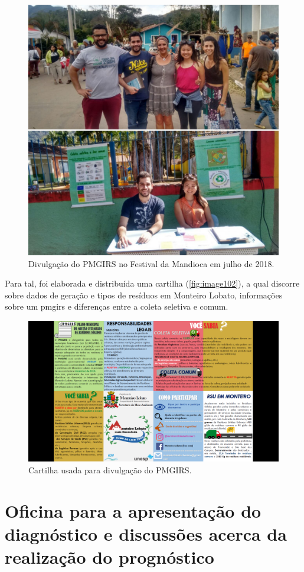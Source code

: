 \begin{figure}
	\centering
	\includegraphics[width=0.75\linewidth]{produtos/prodtres/image101}
	\caption{Divulgação do PMGIRS no Festival da Mandioca em julho de 2018.}
	\label{fig:image101}
\end{figure}

Para tal, foi elaborada e distribuída uma cartilha (\autoref{fig:image102}), a qual discorre sobre dados de geração e tipos de resíduos em Monteiro Lobato, informações sobre um \gls{pmgirs} e diferenças entre a coleta seletiva e comum.

\begin{figure}
	\centering
	\includegraphics[width=0.75\linewidth]{produtos/prodtres/image102}
	\caption{Cartilha usada para divulgação do PMGIRS.}
	\label{fig:image102}
\end{figure}

\section{Oficina para a apresentação do diagnóstico e discussões acerca da realização do prognóstico}

